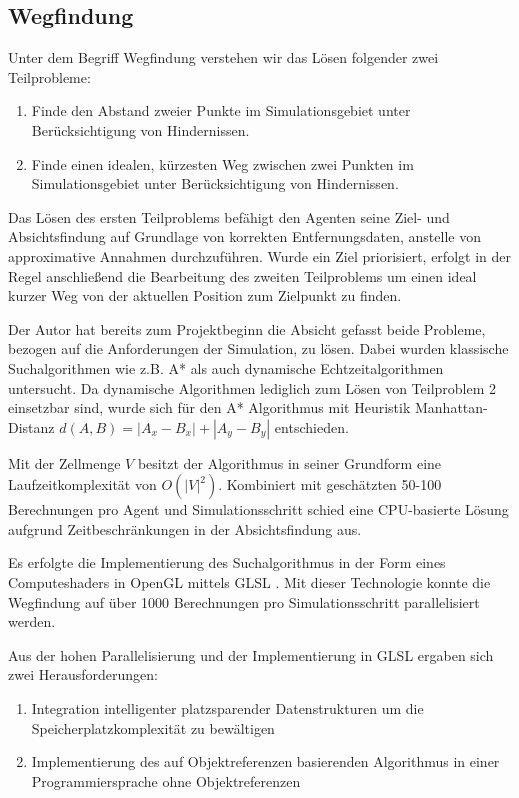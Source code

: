 \documentclass[runningheads]{llncs}
\begin{document}
\subsection{Wegfindung}\label{wegfindung}
Unter dem Begriff Wegfindung verstehen wir das Lösen folgender zwei Teilprobleme:
\begin{enumerate}
\item Finde den Abstand zweier Punkte im Simulationsgebiet unter Berücksichtigung von Hindernissen.
\item Finde einen idealen, kürzesten Weg zwischen zwei Punkten im Simulationsgebiet unter Berücksichtigung von Hindernissen.
\end{enumerate}
Das Lösen des ersten Teilproblems befähigt den Agenten seine Ziel- und Absichtsfindung auf Grundlage von korrekten Entfernungsdaten, anstelle von approximative Annahmen durchzuführen.
Wurde ein Ziel priorisiert, erfolgt in der Regel anschließend die Bearbeitung des zweiten Teilproblems um einen ideal kurzer Weg von der aktuellen Position zum Zielpunkt zu finden.

Der Autor hat bereits zum Projektbeginn die Absicht gefasst beide Probleme, bezogen auf die Anforderungen der Simulation, zu lösen. Dabei wurden klassische Suchalgorithmen wie z.B. A* \cite{Hart1968} als auch dynamische Echtzeitalgorithmen \cite[182-191]{Weiss2000} untersucht. Da dynamische Algorithmen lediglich zum Lösen von Teilproblem 2 einsetzbar sind, wurde sich für den A* Algorithmus mit Heuristik Manhattan-Distanz $d(A, B) = | A_{x} - B_{x} | + | A_{y} - B_{y} |$ entschieden.

Mit der Zellmenge $V$ besitzt der Algorithmus in seiner Grundform eine Laufzeitkomplexität von $O(|V|^{2})$. Kombiniert mit geschätzten 50-100 Berechnungen pro Agent und Simulationsschritt schied eine CPU-basierte Lösung aufgrund Zeitbeschränkungen in der Absichtsfindung aus.

Es erfolgte die Implementierung des Suchalgorithmus in der Form eines Computeshaders in OpenGL mittels GLSL \cite{GLSL}. Mit dieser Technologie konnte die Wegfindung auf über 1000 Berechnungen pro Simulationsschritt parallelisiert werden.

Aus der hohen Parallelisierung und der Implementierung in GLSL ergaben sich zwei Herausforderungen:
\begin{enumerate}
\item Integration intelligenter platzsparender Datenstrukturen um die Speicherplatzkomplexität zu bewältigen
\item Implementierung des auf Objektreferenzen basierenden Algorithmus in einer Programmiersprache ohne Objektreferenzen
\end{enumerate}
\end{document}
